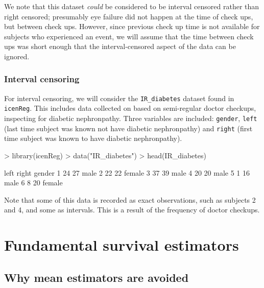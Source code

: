 \documentclass[a4paper]{article}
\begin{document}
   We note that this dataset \emph{could} be considered to be interval censored rather than right censored; presumably eye failure did not happen at the time of check ups, but between check ups. However, since previous check up time is not available for subjects who experienced an event, we will assume that the time between check ups was short enough that the interval-censored aspect of the data can be ignored. 

    \subsubsection{Interval censoring}

    For interval censoring, we will consider the \texttt{IR\_diabetes} dataset found in \texttt{icenReg}. This includes data collected on based on semi-regular doctor checkups, inspecting for diabetic nephronpathy. Three variables are included: \texttt{gender}, \texttt{left} (last time subject was known not have diabetic nephronpathy) and \texttt{right} (first time subject was known to have diabetic nephronpathy). 
    
\begin{Schunk}
\begin{Sinput}
> library(icenReg)
> data("IR_diabetes")
> head(IR_diabetes)
\end{Sinput}
\begin{Soutput}
  left right gender
1   24    27   male
2   22    22 female
3   37    39   male
4   20    20   male
5    1    16   male
6    8    20 female
\end{Soutput}
\end{Schunk}

Note that some of this data is recorded as exact observations, such as subjects 2 and 4, and some as intervals. This is a result of the frequency of doctor checkups. 


\section{Fundamental survival estimators}
  
  \subsection{Why mean estimators are avoided}
  
\end{document}
